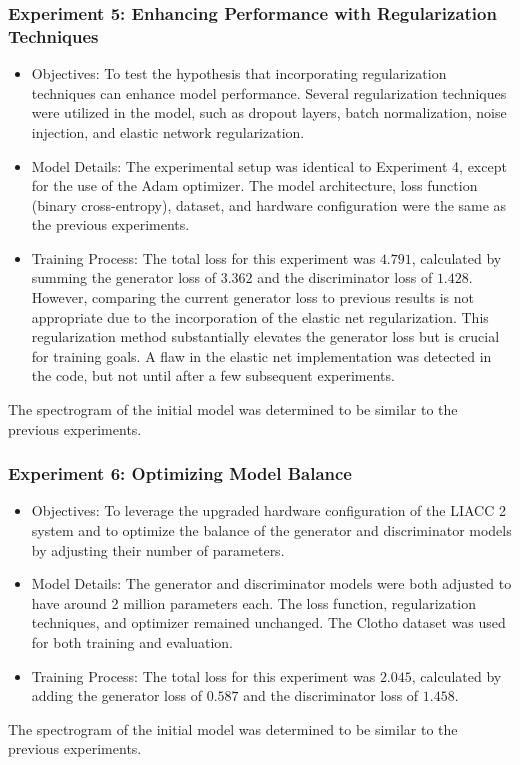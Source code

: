 \begin{frame}
    \frametitle{Experiment 5: Enhancing Performance with Regularization Techniques}

    \begin{itemize}
        \item Objectives: To test the hypothesis that incorporating regularization techniques can enhance model performance. Several regularization techniques were utilized in the model, such as dropout layers, batch normalization, noise injection, and elastic network regularization.
        \item Model Details: The experimental setup was identical to Experiment 4, except for the use of the Adam optimizer. The model architecture, loss function (binary cross-entropy), dataset, and hardware configuration were the same as the previous experiments.
        \item Training Process: The total loss for this experiment was $4.791$, calculated by summing the generator loss of $3.362$ and the discriminator loss of $1.428$. However, comparing the current generator loss to previous results is not appropriate due to the incorporation of the elastic net regularization. This regularization method substantially elevates the generator loss but is crucial for training goals. A flaw in the elastic net implementation was detected in the code, but not until after a few subsequent experiments.
    \end{itemize}

    The spectrogram of the initial model was determined to be similar to the previous experiments.

\end{frame}

\begin{frame}
    \frametitle{Experiment 6: Optimizing Model Balance}

    \begin{itemize}
        \item Objectives: To leverage the upgraded hardware configuration of the LIACC 2 system and to optimize the balance of the generator and discriminator models by adjusting their number of parameters.
        \item Model Details: The generator and discriminator models were both adjusted to have around 2 million parameters each. The loss function, regularization techniques, and optimizer remained unchanged. The Clotho dataset was used for both training and evaluation.
        \item Training Process: The total loss for this experiment was $2.045$, calculated by adding the generator loss of $0.587$ and the discriminator loss of $1.458$.
    \end{itemize}

    The spectrogram of the initial model was determined to be similar to the previous experiments.
\end{frame}

